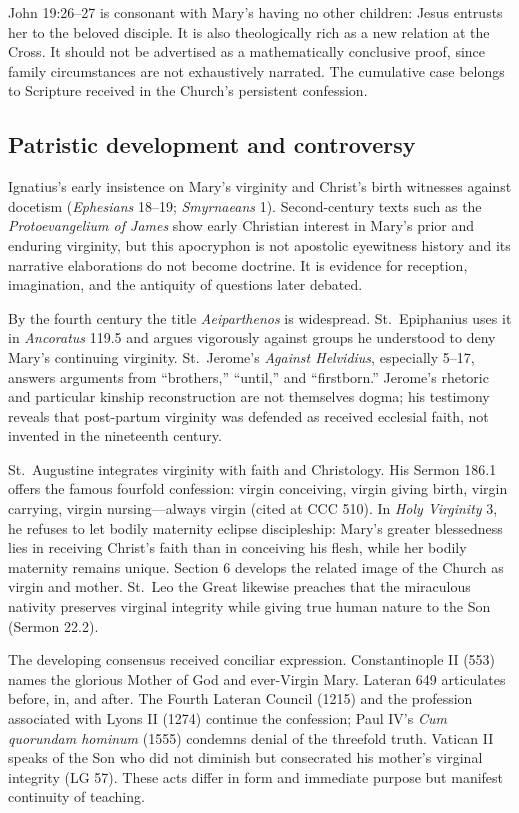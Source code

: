 John 19:26--27 is consonant with Mary's having no other children: Jesus entrusts her to the beloved disciple. It is also theologically rich as a new relation at the Cross. It should not be advertised as a mathematically conclusive proof, since family circumstances are not exhaustively narrated. The cumulative case belongs to Scripture received in the Church's persistent confession.

\subsection{Patristic development and controversy}

Ignatius's early insistence on Mary's virginity and Christ's birth witnesses against docetism (\emph{Ephesians} 18--19; \emph{Smyrnaeans} 1). Second-century texts such as the \emph{Protoevangelium of James} show early Christian interest in Mary's prior and enduring virginity, but this apocryphon is not apostolic eyewitness history and its narrative elaborations do not become doctrine. It is evidence for reception, imagination, and the antiquity of questions later debated.

By the fourth century the title \emph{Aeiparthenos} is widespread. St.~Epiphanius uses it in \emph{Ancoratus} 119.5 and argues vigorously against groups he understood to deny Mary's continuing virginity. St.~Jerome's \emph{Against Helvidius}, especially 5--17, answers arguments from ``brothers,'' ``until,'' and ``firstborn.'' Jerome's rhetoric and particular kinship reconstruction are not themselves dogma; his testimony reveals that post-partum virginity was defended as received ecclesial faith, not invented in the nineteenth century.

St.~Augustine integrates virginity with faith and Christology. His Sermon 186.1 offers the famous fourfold confession: virgin conceiving, virgin giving birth, virgin carrying, virgin nursing---always virgin (cited at CCC 510). In \emph{Holy Virginity} 3, he refuses to let bodily maternity eclipse discipleship: Mary's greater blessedness lies in receiving Christ's faith than in conceiving his flesh, while her bodily maternity remains unique. Section 6 develops the related image of the Church as virgin and mother. St.~Leo the Great likewise preaches that the miraculous nativity preserves virginal integrity while giving true human nature to the Son (Sermon 22.2).

The developing consensus received conciliar expression. Constantinople II (553) names the glorious Mother of God and ever-Virgin Mary. Lateran 649 articulates before, in, and after. The Fourth Lateran Council (1215) and the profession associated with Lyons II (1274) continue the confession; Paul IV's \emph{Cum quorundam hominum} (1555) condemns denial of the threefold truth. Vatican II speaks of the Son who did not diminish but consecrated his mother's virginal integrity (LG 57). These acts differ in form and immediate purpose but manifest continuity of teaching.

